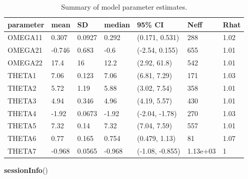 \documentclass[]{article}
\newenvironment{Shaded}{\begin{snugshade}}{\end{snugshade}}
\newcommand{\KeywordTok}[1]{\textcolor[rgb]{0.13,0.29,0.53}{\textbf{{#1}}}}
\newcommand{\NormalTok}[1]{{#1}}
\begin{document}
\begin{table}

\caption{\label{tab:parameters}Summary of model parameter estimates.}
\centering
\begin{tabular}[t]{l|l|l|l|l|l|l}
\hline
parameter & mean & SD & median & 95\% CI & Neff & Rhat\\
\hline
OMEGA11 & 0.307 & 0.0927 & 0.292 & (0.171, 0.531) & 288 & 1.02\\
\hline
OMEGA21 & -0.746 & 0.683 & -0.6 & (-2.54, 0.155) & 655 & 1.01\\
\hline
OMEGA22 & 17.4 & 16 & 12.2 & (2.92, 61.8) & 542 & 1.01\\
\hline
THETA1 & 7.06 & 0.123 & 7.06 & (6.81, 7.29) & 171 & 1.03\\
\hline
THETA2 & 5.72 & 1.19 & 5.88 & (3.02, 7.54) & 358 & 1.01\\
\hline
THETA3 & 4.94 & 0.346 & 4.96 & (4.19, 5.57) & 430 & 1.01\\
\hline
THETA4 & -1.92 & 0.0673 & -1.92 & (-2.04, -1.78) & 270 & 1.03\\
\hline
THETA5 & 7.32 & 0.14 & 7.32 & (7.04, 7.59) & 557 & 1.01\\
\hline
THETA6 & 0.77 & 0.165 & 0.754 & (0.479, 1.13) & 81 & 1.07\\
\hline
THETA7 & -0.968 & 0.0565 & -0.968 & (-1.08, -0.855) & 1.13e+03 & 1\\
\hline
\end{tabular}
\end{table}

\begin{Shaded}
\begin{Highlighting}[]
\KeywordTok{sessionInfo}\NormalTok{()}
\end{Highlighting}
\end{Shaded}
\end{document}
